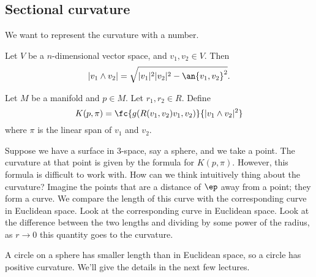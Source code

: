 \subsection{Sectional curvature}
We want to represent the curvature with a number.

Let $V$ be a $n$-dimensional vector space, and $v_1,v_2\in V$. Then
\[
|v_1\wedge v_2|=\sqrt{|v_1|^2|v_2|^2-\an{v_1,v_2}^2}.
\]


Let $M$ be a manifold and $p\in M$. Let $r_1,r_2\in R$. Define
\[
K(p,\pi) =\fc{g(R(v_1,v_2)v_1,v_2)}{|v_1\wedge v_2|^2}
\]
where $\pi$ is the linear span of $v_1$ and $v_2$.

Suppose we have a surface in 3-space, say a sphere, and we take a point. The curvature at that point is given by the formula for $K(p,\pi)$. However, this formula is difficult to work with. How can we think intuitively thing about the curvature? Imagine the points that are a distance of $\ep$ away from a point; they form a curve. We compare the length of this curve with the corresponding curve in Euclidean space. Look at the corresponding curve in Euclidean space. Look at the difference between the two lengths and dividing by some power of the radius, as $r\to 0$
this quantity  goes to the curvature.

A circle on a sphere has smaller length than in Euclidean space, so a circle has positive curvature. We'll give the details in the next few lectures. %